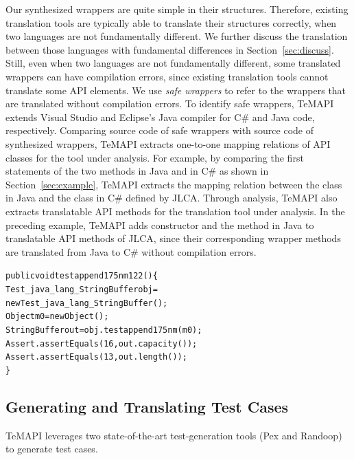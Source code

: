 Our synthesized wrappers are quite simple in their structures. Therefore, existing translation tools are typically able to translate their structures correctly, when two languages are not fundamentally different. We further discuss the translation between those languages with fundamental differences in Section~\ref{sec:discuss}. Still, even when two languages are not fundamentally different, some translated wrappers can have compilation errors, since existing translation tools cannot translate some API elements. We use \emph{safe wrappers} to refer to the wrappers that are translated without compilation errors. To identify safe wrappers, TeMAPI extends Visual Studio and Eclipse's Java compiler for C\# and Java code, respectively. Comparing source code of safe wrappers with source code of synthesized wrappers, TeMAPI extracts one-to-one mapping relations of API classes for the tool under analysis. For example, by comparing the first statements of the two  methods in Java and in C\# as shown in Section~\ref{sec:example}, TeMAPI extracts the mapping relation between the  class in Java and the  class in C\# defined by JLCA. Through analysis, TeMAPI also extracts translatable API methods for the translation tool under analysis. In the preceding example, TeMAPI adds  constructor and the  method in Java to translatable API methods of JLCA, since their corresponding wrapper methods are translated from Java to C\# without compilation errors.


\begin{CodeOut}%
\begin{alltt}
public void testappend175nm122()\{
  Test_java_lang_StringBuffer obj =
        new Test_java_lang_StringBuffer();
  Object m0 = new Object();
  StringBuffer out = obj.testappend175nm(m0);
  Assert.assertEquals(16, out.capacity());	
  Assert.assertEquals(13, out.length());
\}
\end{alltt}
\end{CodeOut}%


\subsection{Generating and Translating Test Cases}
\label{sec:approach:single}
TeMAPI leverages two state-of-the-art test-generation tools (Pex and Randoop) to generate test cases.

